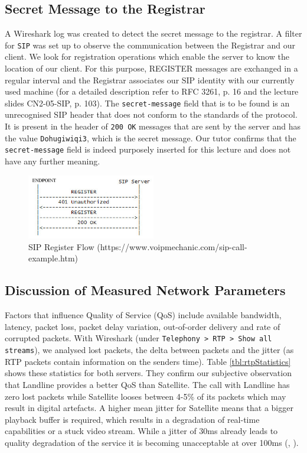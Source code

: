 \documentclass[parskip=full]{scrartcl}
\begin{document}
\subsection{Secret Message to the Registrar}
A Wireshark log was created to detect the secret message to the registrar.
A filter for \texttt{SIP} was set up to observe the communication between the Registrar and our client.
We look for registration operations which enable the server to know the location of our client.
For this purpose, REGISTER messages are exchanged in a regular interval and the Registrar associates our SIP identity with our currently used machine (for a detailed description refer to RFC 3261, p. 16 and the lecture slides CN2-05-SIP, p. 103).
The \texttt{secret-message} field that is to be found is an unrecognised SIP header that does not conform to the standards of the protocol.
It is present in the header of \texttt{200 OK} messages that are sent by the server and has the value \texttt{Dohugiwiqi3}, which is the secret message.
Our tutor confirms that the \texttt{secret-message} field is indeed purposely inserted for this lecture and does not have any further meaning.
\begin{figure}[ht]
    \centering
   \includegraphics[width=0.5\textwidth]{images/sip_register_flow.jpg} 
    \caption{SIP Register Flow (https://www.voipmechanic.com/sip-call-example.htm)}
    \label{fig:sipRegisterFlow}
\end{figure}
\subsection{Discussion of Measured Network Parameters}
Factors that influence Quality of Service (QoS) include available bandwidth, latency, packet loss, packet delay variation, out-of-order delivery and rate of corrupted packets. 
With Wireshark (under \texttt{Telephony > RTP > Show all streams}), we analysed lost packets, the delta between packets and the jitter (as RTP packets contain information on the senders time).
Table \ref{tbl:rtpStatistics} shows these statistics for both servers.
They confirm our subjective observation that Landline provides a better QoS than Satellite.
The call with Landline has zero lost packets while Satellite looses between 4-5\% of its packets which may result in digital artefacts. 
A higher mean jitter for Satellite means that a bigger playback buffer is required, which results in a degradation of real-time capabilities or a stuck video stream. %
While a jitter of 30ms already leads to quality degradation of the service it is becoming unacceptable at over 100ms (\cite{noauthor_voip_2015}, \cite{noauthor_voip_2016}).
\end{document}
